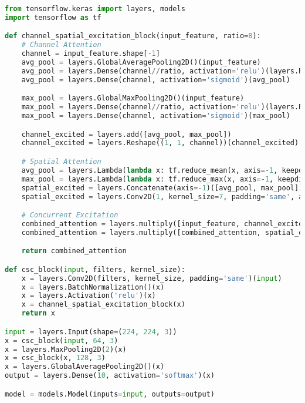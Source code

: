 \begin{lstlisting}[language=Python]
from tensorflow.keras import layers, models
import tensorflow as tf

def channel_spatial_excitation_block(input_feature, ratio=8):
    # Channel Attention
    channel = input_feature.shape[-1]
    avg_pool = layers.GlobalAveragePooling2D()(input_feature)
    avg_pool = layers.Dense(channel//ratio, activation='relu')(layers.Reshape((1, channel))(avg_pool))
    avg_pool = layers.Dense(channel, activation='sigmoid')(avg_pool)

    max_pool = layers.GlobalMaxPooling2D()(input_feature)
    max_pool = layers.Dense(channel//ratio, activation='relu')(layers.Reshape((1, channel))(max_pool))
    max_pool = layers.Dense(channel, activation='sigmoid')(max_pool)

    channel_excited = layers.add([avg_pool, max_pool])
    channel_excited = layers.Reshape((1, 1, channel))(channel_excited)

    # Spatial Attention
    avg_pool = layers.Lambda(lambda x: tf.reduce_mean(x, axis=-1, keepdims=True))(input_feature)
    max_pool = layers.Lambda(lambda x: tf.reduce_max(x, axis=-1, keepdims=True))(input_feature)
    spatial_excited = layers.Concatenate(axis=-1)([avg_pool, max_pool])
    spatial_excited = layers.Conv2D(1, kernel_size=7, padding='same', activation='sigmoid')(spatial_excited)

    # Concurrent Excitation
    combined_attention = layers.multiply([input_feature, channel_excited])
    combined_attention = layers.multiply([combined_attention, spatial_excited])

    return combined_attention

def csc_block(input, filters, kernel_size):
    x = layers.Conv2D(filters, kernel_size, padding='same')(input)
    x = layers.BatchNormalization()(x)
    x = layers.Activation('relu')(x)
    x = channel_spatial_excitation_block(x)
    return x

input = layers.Input(shape=(224, 224, 3))
x = csc_block(input, 64, 3)
x = layers.MaxPooling2D(2)(x)
x = csc_block(x, 128, 3)
x = layers.GlobalAveragePooling2D()(x)
output = layers.Dense(10, activation='softmax')(x)

model = models.Model(inputs=input, outputs=output)
\end{lstlisting}

